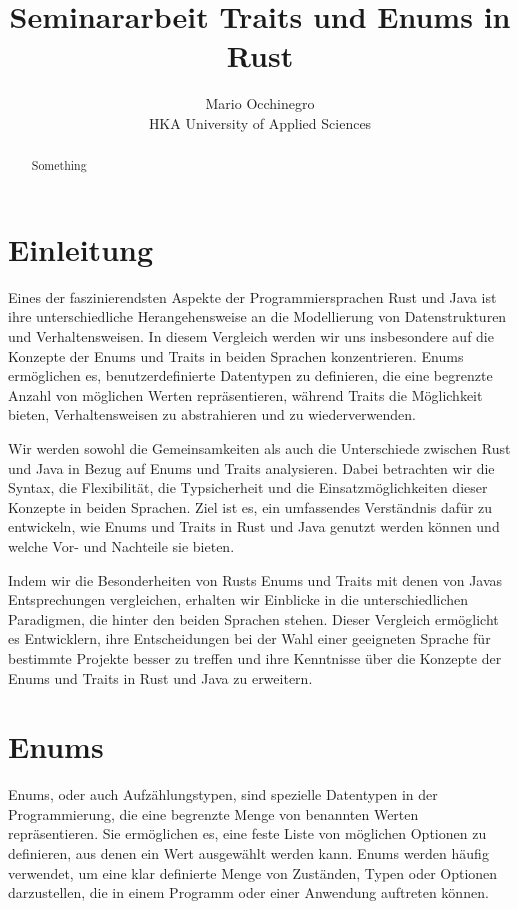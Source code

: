 \documentclass[a4paper, 1ppt]{article}
\title{Seminararbeit Traits und Enums in Rust}
\date{}
\author{Mario Occhinegro\\HKA University of Applied Sciences}
\begin{document}
\maketitle
\newpage
\clearpage
\tableofcontents
\setcounter{page}{1}
\newpage
{}
\maketitle
\begin{abstract}
    Something
\end{abstract}
\section{Einleitung}
Eines der faszinierendsten Aspekte der Programmiersprachen Rust und Java ist ihre unterschiedliche Herangehensweise an die Modellierung von Datenstrukturen und Verhaltensweisen. In diesem Vergleich werden wir uns insbesondere auf die Konzepte der Enums und Traits in beiden Sprachen konzentrieren. Enums ermöglichen es, benutzerdefinierte Datentypen zu definieren, die eine begrenzte Anzahl von möglichen Werten repräsentieren, während Traits die Möglichkeit bieten, Verhaltensweisen zu abstrahieren und zu wiederverwenden.

Wir werden sowohl die Gemeinsamkeiten als auch die Unterschiede zwischen Rust und Java in Bezug auf Enums und Traits analysieren. Dabei betrachten wir die Syntax, die Flexibilität, die Typsicherheit und die Einsatzmöglichkeiten dieser Konzepte in beiden Sprachen. Ziel ist es, ein umfassendes Verständnis dafür zu entwickeln, wie Enums und Traits in Rust und Java genutzt werden können und welche Vor- und Nachteile sie bieten.

Indem wir die Besonderheiten von Rusts Enums und Traits mit denen von Javas Entsprechungen vergleichen, erhalten wir Einblicke in die unterschiedlichen Paradigmen, die hinter den beiden Sprachen stehen. Dieser Vergleich ermöglicht es Entwicklern, ihre Entscheidungen bei der Wahl einer geeigneten Sprache für bestimmte Projekte besser zu treffen und ihre Kenntnisse über die Konzepte der Enums und Traits in Rust und Java zu erweitern.
\section{Enums}
Enums, oder auch Aufzählungstypen, sind spezielle Datentypen in der Programmierung, die eine begrenzte Menge von benannten Werten repräsentieren. Sie ermöglichen es, eine feste Liste von möglichen Optionen zu definieren, aus denen ein Wert ausgewählt werden kann. Enums werden häufig verwendet, um eine klar definierte Menge von Zuständen, Typen oder Optionen darzustellen, die in einem Programm oder einer Anwendung auftreten können.
\end{document}
